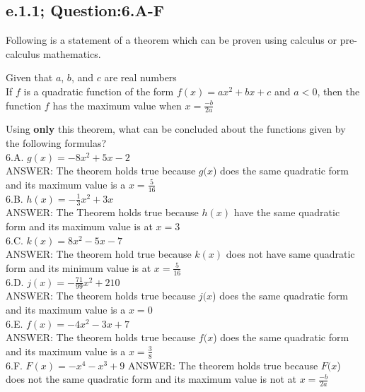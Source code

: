\subsection{e.1.1; Question:6.A-F}

Following is a statement of a theorem which can be proven using calculus or pre-calculus mathematics.  \\
\begin{tcolorbox}
\begin{theorem}
Given that $a$, $b$, and $c$ are real numbers \\
If $f$ is a quadratic function of the form $f(x) = ax^2 + bx + c$ and $a<0$, then the function $f$ has the maximum value when $x = \frac{-b}{2a}$
\end{theorem}
\end{tcolorbox}

Using {\bf only} this theorem, what can be concluded about the functions given by the following formulas? \\

6.A. $g(x) = -8x^2 + 5x -2$ \\
	ANSWER: The theorem holds true because $g(x$) does the same quadratic form and its maximum value is a $x = \frac{5}{16}$ \\

6.B. $h(x) = -\frac{1}{3}x^2 + 3x$ \\
	ANSWER: The Theorem holds true because $h(x)$ have the same quadratic form and its maximum value is at $x=3$ \\

6.C. $k(x) = 8x^2 - 5x -7$ \\
	ANSWER: The theorem hold true because $k(x)$ does not have same quadratic form and its minimum value is at $x = \frac{5}{16}$ \\

6.D. $j(x) = -\frac{71}{99}x^2+ 210$ \\
	ANSWER: The theorem holds true because $j(x$) does the same quadratic form and its maximum value is a $x = 0$  \\

6.E. $f(x) = -4x^2 - 3x +7$ \\
	ANSWER: The theorem holds true because $f(x$) does the same quadratic form and its maximum value is a $x = \frac{3}{8}$ \\

6.F. $F(x) = -x^4 - x^3 + 9$ 
	ANSWER: The theorem holds true because $F(x$) does not the same quadratic form and its maximum value is not at $x = \frac{-b}{2a}$ \\



